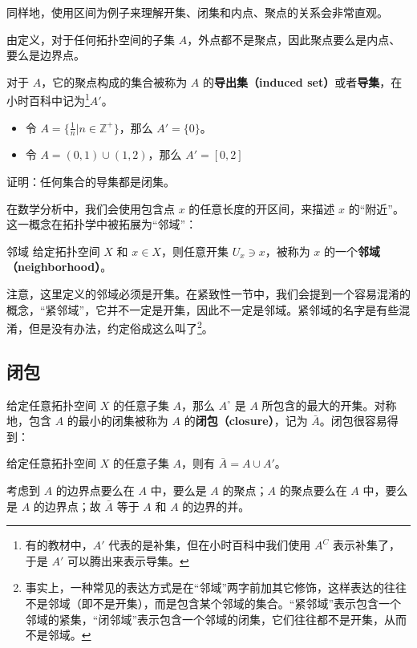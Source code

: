 同样地，使用区间为例子来理解开集、闭集和内点、聚点的关系会非常直观。

由定义，对于任何拓扑空间的子集 $A$，外点都不是聚点，因此聚点要么是内点、要么是边界点。

对于 $A$，它的聚点构成的集合被称为 $A$ 的\textbf{导出集（induced set）}或者\textbf{导集}，在小时百科中记为\footnote{有的教材中，$A'$ 代表的是补集，但在小时百科中我们使用 $A^C$ 表示补集了，于是 $A'$ 可以腾出来表示导集。}$A'$。

\begin{example}{}
\begin{itemize}
\item 令 $A=\{\frac{1}{n}|n\in\mathbb{Z}^+\}$，那么 $A'=\{0\}$。
\item 令 $A=(0,1)\cup(1,2)$，那么 $A'=[0,2]$
\end{itemize}
\end{example}

\begin{exercise}{}
证明：任何集合的导集都是闭集。
\end{exercise}

在数学分析中，我们会使用包含点 $x$ 的任意长度的开区间，来描述 $x$ 的“附近”。这一概念在拓扑学中被拓展为“邻域”：

\begin{definition}{邻域}
给定拓扑空间 $X$ 和 $x\in X$，则任意开集 $U_x\ni x$，被称为 $x$ 的一个\textbf{邻域（neighborhood）}。
\end{definition}

注意，这里定义的邻域必须是开集。在紧致性一节中，我们会提到一个容易混淆的概念，“紧邻域”，它并不一定是开集，因此不一定是邻域。紧邻域的名字是有些混淆，但是没有办法，约定俗成这么叫了\footnote{事实上，一种常见的表达方式是在“邻域”两字前加其它修饰，这样表达的往往不是邻域（即不是开集），而是包含某个邻域的集合。“紧邻域”表示包含一个邻域的紧集，“闭邻域”表示包含一个邻域的闭集，它们往往都不是开集，从而不是邻域。}。



\subsection{闭包}

给定任意拓扑空间 $X$ 的任意子集 $A$，那么 $A^\circ$ 是 $A$ 所包含的最大的开集。对称地，包含 $A$ 的最小的闭集被称为 $A$ 的\textbf{闭包（closure）}，记为 $\bar{A}$。闭包很容易得到：

\begin{theorem}{}
给定任意拓扑空间 $X$ 的任意子集 $A$，则有 $\bar{A}=A\cup A'$。
\end{theorem}
\begin{corollary}{}\label{cor_Topo0_1}
考虑到 $A$ 的边界点要么在 $A$ 中，要么是 $A$ 的聚点；$A$ 的聚点要么在 $A$ 中，要么是 $A$ 的边界点；故 $\bar{A}$ 等于 $A$ 和 $A$ 的边界的并。
\end{corollary}

